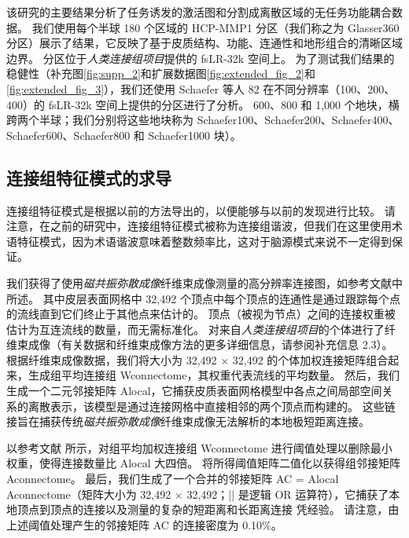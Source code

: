 \documentclass[lang=cn,a4paper,newtx,citestyle=gb7714-2015, bibstyle=gb7714-2015]{elegantpaper}
\begin{document}
该研究的主要结果分析了任务诱发的激活图和分割成离散区域的无任务功能耦合数据。
我们使用每个半球 180 个区域的 HCP-MMP1 分区（我们称之为 Glasser360 分区）展示了结果，它反映了基于皮质结构、功能、连通性和地形组合的清晰区域边界\cite{glasser2016multi}。
分区位于\textit{人类连接组项目}提供的 fsLR-32k 空间上。
为了测试我们结果的稳健性（补充图\ref{fig:supp_2}和扩展数据图\ref{fig:extended_fig_2}和\ref{fig:extended_fig_3}），我们还使用 Schaefer 等人 82 在不同分辨率（100、200、400）的 fsLR-32k 空间上提供的分区进行了分析。
600、800 和 1,000 个地块，横跨两个半球；我们分别将这些地块称为 Schaefer100、Schaefer200、Schaefer400、Schaefer600、Schaefer800 和 Schaefer1000 块）。


\subsection{连接组特征模式的求导} \label{sec:connectome_derivation}

连接组特征模式是根据以前的方法\cite{naze2021robustness}导出的，以便能够与以前的发现进行比较。
请注意，在之前的研究中\cite{atasoy2016human,preti2019decoupling,naze2021robustness,rue2021connectome}，连接组特征模式被称为连接组谐波，但我们在这里使用术语特征模式，因为术语谐波意味着整数频率比，这对于脑源模式来说不一定得到保证。


我们获得了使用\textit{磁共振弥散成像}纤维束成像测量的高分辨率连接图，如参考文献\cite{tian2021high}中所述。
其中皮层表面网格中 32,492 个顶点中每个顶点的连通性是通过跟踪每个点的流线直到它们终止于其他点来估计的。
顶点（被视为节点）之间的连接权重被估计为互连流线的数量，而无需标准化\cite{tournier2019mrtrix3}。
对来自\textit{人类连接组项目}的个体进行了纤维束成像（有关数据和纤维束成像方法的更多详细信息，请参阅补充信息 2.3）。 
根据纤维束成像数据，我们将大小为 32,492 × 32,492 的个体加权连接矩阵组合起来，生成组平均连接组 Wconnectome，其权重代表流线的平均数量。
然后，我们生成一个二元邻接矩阵 Alocal，它捕获皮质表面网格模型中各点之间局部空间关系的离散表示，该模型是通过连接网格中直接相邻的两个顶点而构建的。
这些链接旨在捕获传统\textit{磁共振弥散成像}纤维束成像无法解析的本地极短距离连接。


以参考文献\cite{naze2021robustness} 所示，对组平均加权连接组 Wconnectome 进行阈值处理以删除最小权重，使得连接数量比 Alocal 大四倍。
将所得阈值矩阵二值化以获得组邻接矩阵 Aconnectome。 
最后，我们生成了一个合并的邻接矩阵 AC = Alocal Aconnectome（矩阵大小为 32,492 × 32,492；|| 是逻辑 OR 运算符），它捕获了本地顶点到顶点的连接以及测量的复杂的短距离和长距离连接 凭经验。
请注意，由上述阈值处理产生的邻接矩阵 AC 的连接密度为 0.10\%。
\end{document}
